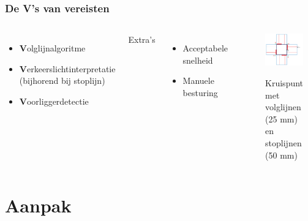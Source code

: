 \documentclass
   [kulak,aspectratio=169,<options>] %
   {kulakbeamer}
\begin{document}
\begin{frame}
\frametitle{De V's van vereisten}
\begin{columns}
	\begin{itemize}
		\item \textbf{V}olglijnalgoritme
		\item \textbf{V}erkeerslichtinterpretatie (bijhorend bij stoplijn)
		\item \textbf{V}oorliggerdetectie

	\end{itemize}
	Extra's
	\begin{itemize}
		\item Acceptabele snelheid
		\item Manuele besturing
	\end{itemize}
	
		\begin{figure}
			\centering
			\includegraphics[width=.7\textwidth]{volglijnenEnStoplijnen}
			\caption{Kruispunt met volglijnen (25 mm) en stoplijnen (50 mm)}\cite{OpgavePO2}
		\end{figure}
	
\end{columns}

\end{frame}



\section{Aanpak}
\end{document}
